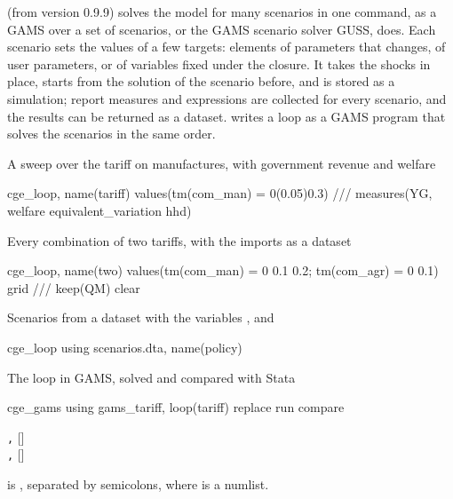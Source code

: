 

 (from version 0.9.9) solves the model for many scenarios in one
command, as a GAMS  over a set of scenarios, or the GAMS scenario
solver GUSS, does. Each scenario sets the values of a few targets: elements of
parameters that  changes, of user parameters, or of
variables fixed under the closure. It takes the shocks in place, starts from
the solution of the scenario before, and is stored as a simulation; report
measures and expressions are collected for every scenario, and the results can
be returned as a dataset.  writes a loop as a GAMS program
that solves the scenarios in the same order.


A sweep over the tariff on manufactures, with government revenue and welfare
\begin{stcode}
cge_loop, name(tariff) values(tm(com_man) = 0(0.05)0.3) ///
    measures(YG, welfare equivalent_variation hhd)
\end{stcode}
Every combination of two tariffs, with the imports as a dataset
\begin{stcode}
cge_loop, name(two) values(tm(com_man) = 0 0.1 0.2; tm(com_agr) = 0 0.1) grid ///
    keep(QM) clear
\end{stcode}
Scenarios from a dataset with the variables ,  and
\begin{stcode}
cge_loop using scenarios.dta, name(policy)
\end{stcode}
The loop in GAMS, solved and compared with Stata
\begin{stcode}
cge_gams using gams_tariff, loop(tariff) replace run compare
\end{stcode}


\begin{stsyntax}
 \texttt{,}   []\\
   \texttt{,}  []
\end{stsyntax}
 is  \cmd{=} , separated by semicolons,
where  is a numlist.

